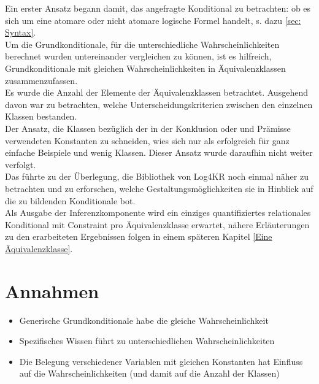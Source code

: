 \documentclass[a4paper, 11pt]{book}
\begin{document}
Ein erster Ansatz begann damit, das angefragte Konditional zu betrachten: ob es sich um eine atomare oder nicht atomare logische Formel handelt, s. dazu \ref{sec: Syntax}.\\
Um die Grundkonditionale, für die unterschiedliche Wahrscheinlichkeiten berechnet wurden untereinander vergleichen zu können, ist es hilfreich, Grundkonditionale mit gleichen Wahrscheinlichkeiten in Äquivalenzklassen  zusammenzufassen.\\
Es wurde die Anzahl der Elemente der Äquivalenzklassen  betrachtet. Ausgehend davon war zu betrachten, welche Unterscheidungskriterien zwischen den einzelnen Klassen bestanden.\\
Der Ansatz, die Klassen bezüglich der in der Konklusion oder und Prämisse verwendeten Konstanten zu schneiden, wies sich nur als erfolgreich für ganz einfache Beispiele und wenig Klassen. Dieser Ansatz wurde daraufhin nicht weiter verfolgt.\\
Das führte zu der Überlegung, die Bibliothek von Log4KR noch einmal näher zu betrachten und zu erforschen, welche Gestaltungsmöglichkeiten sie in Hinblick auf die zu bildenden Konditionale bot.\\
Als Ausgabe der Inferenzkomponente wird ein einziges quantifiziertes relationales Konditional mit Constraint pro Äquivalenzklasse erwartet, nähere Erläuterungen zu den erarbeiteten Ergebnissen folgen in einem späteren Kapitel \ref{Eine Äquivalenzklasse}.


\section{Annahmen}

\begin{itemize}
	\item Generische Grundkonditionale habe die gleiche Wahrscheinlichkeit
	\item Spezifisches Wissen führt zu unterschiedlichen Wahrscheinlichkeiten
	\item Die Belegung verschiedener Variablen mit gleichen Konstanten hat Einfluss auf die Wahrscheinlichkeiten (und damit auf die Anzahl der Klassen)
	
\end{itemize}


\fontsize{11pt}{13.2pt}\selectfont

\setlongtables
\end{document}
